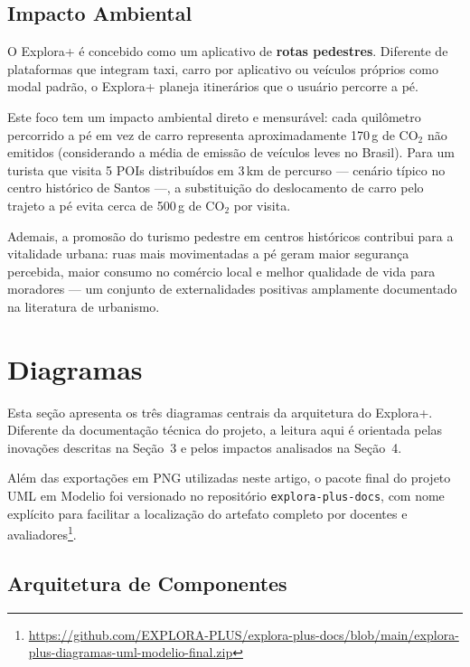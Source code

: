 \documentclass[12pt, a4paper]{article}
\begin{document}
\subsection{Impacto Ambiental}

O Explora+ \'e concebido como um aplicativo de \textbf{rotas pedestres}. Diferente de plataformas que integram taxi, carro por aplicativo ou ve\'iculos pr\'oprios como modal padr\~ao, o Explora+ planeja itiner\'arios que o usu\'ario percorre a p\'e.

Este foco tem um impacto ambiental direto e mensur\'avel: cada quilômetro percorrido a p\'e em vez de carro representa aproximadamente 170\,g de CO$_2$ n\~ao emitidos (considerando a m\'edia de emiss\~ao de ve\'iculos leves no Brasil). Para um turista que visita 5 POIs distribu\'idos em 3\,km de percurso --- cen\'ario t\'ipico no centro hist\'orico de Santos ---, a substitui\c{c}\~ao do deslocamento de carro pelo trajeto a p\'e evita cerca de 500\,g de CO$_2$ por visita.

Ademais, a promos\~ao do turismo pedestre em centros hist\'oricos contribui para a vitalidade urbana: ruas mais movimentadas a p\'e geram maior seguran\c{c}a percebida, maior consumo no com\'ercio local e melhor qualidade de vida para moradores --- um conjunto de externalidades positivas amplamente documentado na literatura de urbanismo.

\clearpage
\section{Diagramas}

Esta se\c{c}\~ao apresenta os tr\^es diagramas centrais da arquitetura do Explora+. Diferente da documenta\c{c}\~ao t\'ecnica do projeto, a leitura aqui \'e orientada pelas inova\c{c}\~oes descritas na Se\c{c}\~ao~3 e pelos impactos analisados na Se\c{c}\~ao~4.

Al\'em das exporta\c{c}\~oes em PNG utilizadas neste artigo, o pacote final do projeto UML em Modelio foi versionado no reposit\'orio \texttt{explora-plus-docs}, com nome expl\'icito para facilitar a localiza\c{c}\~ao do artefato completo por docentes e avaliadores\footnote{\url{https://github.com/EXPLORA-PLUS/explora-plus-docs/blob/main/explora-plus-diagramas-uml-modelio-final.zip}}.

\subsection{Arquitetura de Componentes}
\end{document}
